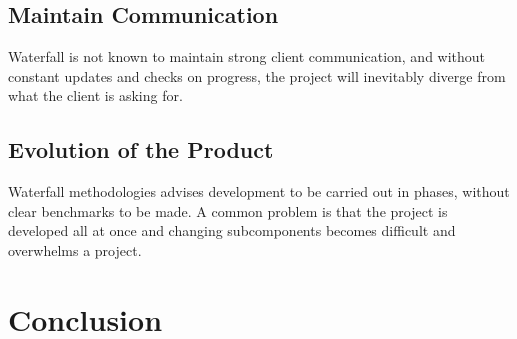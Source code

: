 \documentclass[11pt]{article}
\begin{document}
\begin{doublespace}
\subsection{Maintain Communication}
Waterfall is not known to maintain strong client communication, and without constant updates and checks on progress,
the project will inevitably diverge from what the client is asking for.

\subsection{Evolution of the Product}
Waterfall methodologies advises development to be carried out in phases, without clear benchmarks to be made. A common problem
is that the project is developed all at once and changing subcomponents becomes difficult and overwhelms a project.

\section{Conclusion}

\end{doublespace}

\nocite{*}



\end{document}
